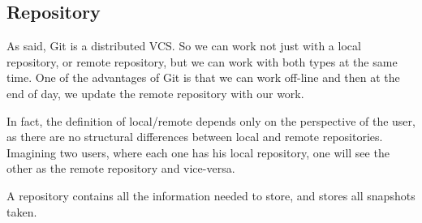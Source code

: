 \subsection{Repository}
As said, Git is a distributed VCS. So we can work not just with a local repository,
or remote repository, but we can work with both types at the same time. One of 
the advantages of Git is that we can work off-line and then at the end of day,
we update the remote repository with our work. \par
In fact, the definition of local/remote depends only on the perspective of the user,
as there are no structural differences between local and remote repositories. 
Imagining two users, where each one has his local repository, 
one will see the other as the remote repository and vice-versa. \par
A repository contains all the information needed to store, and stores all snapshots taken.
%
